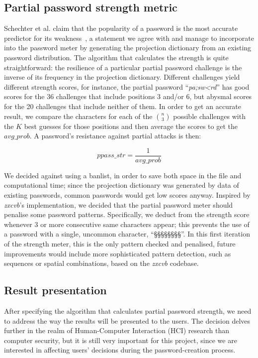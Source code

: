   \subsection{Partial password strength metric}
    \label{ssec:str_metric}
    Schechter et al. claim that the popularity of a password is the most accurate predictor for its weakness~\cite{pass_popularity}, a statement we agree with and manage to incorporate into the password meter by generating the projection dictionary from an existing password distribution. The algorithm that calculates the strength is quite straightforward: the resilience of a particular partial password challenge is the inverse of its frequency in the projection dictionary. Different challenges yield different strength scores, for instance, the partial password ``\emph{pa;sw<rd}'' has good scores for the 36 challenges that include positions 3 and/or 6, but abysmal scores for the 20 challenges that include neither of them. In order to get an accurate result, we compare the characters for each of the ${n \choose 3}$ possible challenges with the $K$ best guesses for those positions and then average the scores to get the $avg\_prob$. A password's resistance against partial attacks is then:

    \[ ppass\_str = \frac{1}{avg\_prob} \]

    We decided against using a banlist, in order to save both space in the file and computational time; since the projection dictionary was generated by data of existing passwords, common passwords would get low scores anyway. Inspired by \emph{zxcvb}'s implementation, we decided that the partial password meter should penalise some password patterns. Specifically, we deduct from the strength score whenever 3 or more consecutive same characters appear; this prevents the use of a password with a single, uncommon character, \eg ``§§§§§§§§''. In this first iteration of the strength meter, this is the only pattern checked and penalised, future improvements would include more sophisticated pattern detection, such as sequences or spatial combinations, based on the \emph{zxcvb} codebase.

  \subsection{Result presentation}
    \label{ssec:result_presentation}
    After specifying the algorithm that calculates partial password strength, we need to address the way the results will be presented to the users. The decision delves further in the realm of Human-Computer Interaction (HCI) research than computer security, but it is still very important for this project, since we are interested in affecting users' decisions during the password-creation process.

